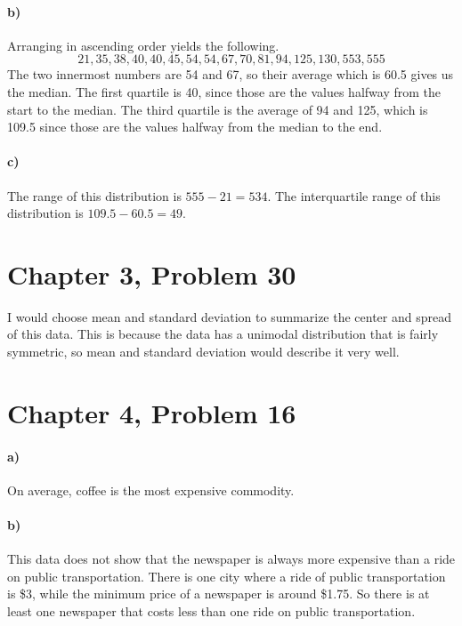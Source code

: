 \documentclass[12pt]{article}
\begin{document}
\paragraph{b)}

Arranging in ascending order yields the following.
\[21, 35, 38, 40, 40, 45, 54, 54, 67, 70, 81, 94, 125, 130, 553, 555\]
The two innermost numbers are 54 and 67, so their average which is 60.5 gives us the median.
The first quartile is 40, since those are the values halfway from the start to the median.
The third quartile is the average of 94 and 125, which is 109.5 since those are the values halfway from
the median to the end.

\paragraph{c)}

The range of this distribution is \(555-21=534\). The interquartile range of this distribution is
\(109.5-60.5=49\).

\section*{Chapter 3, Problem 30}

I would choose mean and standard deviation to summarize the center and spread of this data. This is
because the data has a unimodal distribution that is fairly symmetric, so mean and standard deviation
would describe it very well.

\section*{Chapter 4, Problem 16}

\paragraph{a)}

On average, coffee is the most expensive commodity.

\paragraph{b)}

This data does not show that the newspaper is always more expensive than a ride on public transportation.
There is one city where a ride of public transportation is \$3, while the minimum price of a newspaper
is around \$1.75. So there is at least one newspaper that costs less than one ride on public
transportation.
\end{document}
